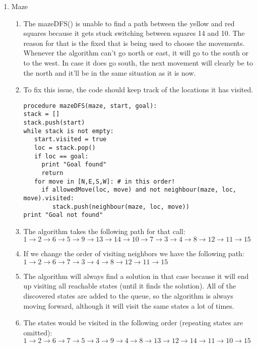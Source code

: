 \documentclass[a4paper]{article}
\begin{document}
\begin{enumerate}
\begin{enumerate}
\begin{itemize}
\end{itemize}
\end{enumerate}
\item Maze
\begin{enumerate}
\item The mazeDFS() is unable to find a path between the yellow and red squares because it gets stuck switching between squares 14 and 10. The reason for that is the fixed that is being used to choose the movements. Whenever the algorithm can't go north or east, it will go to the south or to the west. In case it does go south, the next movement will clearly be to the north and it'll be in the same situation as it is now.

\item To fix this issue, the code should keep track of the locations it has visited.
\begin{lstlisting}[style = stdio]
procedure mazeDFS(maze, start, goal):
stack = []
stack.push(start)
while stack is not empty:
   start.visited = true
   loc = stack.pop()
   if loc == goal:
     print "Goal found"
     return
   for move in [N,E,S,W]: # in this order!          
     if allowedMove(loc, move) and not neighbour(maze, loc, move).visited:
        stack.push(neighbour(maze, loc, move))
print "Goal not found"
\end{lstlisting}
\item The algorithm takes the following path for that call: \\
$
1 \xrightarrow{} 2 \xrightarrow{} 6 \xrightarrow{} 5 \xrightarrow{} 9 \xrightarrow{} 13 \xrightarrow{} 14 \xrightarrow{} 10 \xrightarrow{} 7 \xrightarrow{} 3 \xrightarrow{} 4 \xrightarrow{} 8 \xrightarrow{} 12 \xrightarrow{} 11 \xrightarrow{} 15
$

\item If we change the order of visiting neighbors we have the following path: \\
$
1 \xrightarrow{} 2 \xrightarrow{} 6 \xrightarrow{} 7 \xrightarrow{} 3 \xrightarrow{} 4 \xrightarrow{} 8 \xrightarrow{} 12 \xrightarrow{} 11 \xrightarrow{} 15
$

\item The algorithm will always find a solution in that case because it will end up visiting all reachable states (until it finds the solution). All of the discovered states are added to the queue, so the algorithm is always moving forward, although it will visit the same states a lot of times.

\item The states would be visited in the following order (repeating states are omitted):\\
$
1 \xrightarrow{} 2 \xrightarrow{} 6 \xrightarrow{} 7 \xrightarrow{} 5 \xrightarrow{} 3 \xrightarrow{} 9 \xrightarrow{} 4 \xrightarrow{} 8 \xrightarrow{} 13 \xrightarrow{} 12 \xrightarrow{} 14 \xrightarrow{} 11 \xrightarrow{} 10 \xrightarrow{} 15
$


\end{enumerate}
\end{enumerate}
\end{document}
